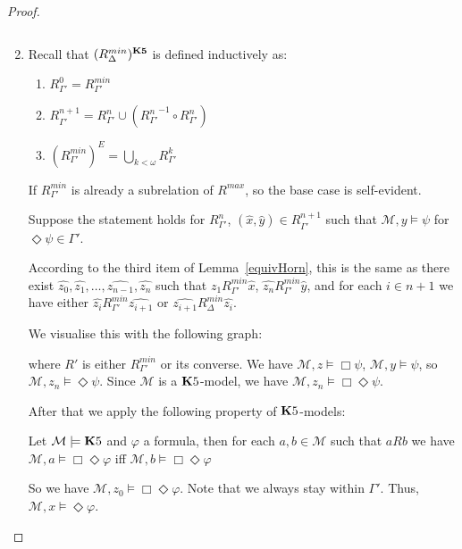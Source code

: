 \documentclass[a4paper]{article}
\theoremstyle{defin}
\theoremstyle{theorem}
\theoremstyle{prop}
\theoremstyle{lemma}
\theoremstyle{fact}
\theoremstyle{exercise}
\theoremstyle{ex}
\theoremstyle{col}
\theoremstyle{claim}
\begin{document}
\begin{proof}
\begin{enumerate}
  $ $

  \item Recall that $(R^{min}_{\Delta})^{\bf K5}$ is defined inductively as:
  \begin{enumerate}
    \item $R_{\Gamma'}^{0} = R_{\Gamma'}^{min}$
    \item $R_{\Gamma'}^{n + 1} = R_{\Gamma'}^{n} \cup ({R_{\Gamma'}^{n}}^{-1} \circ R_{\Gamma'}^{n})$
    \item $(R^{min}_{\Gamma'})^{E} = \bigcup_{k < \omega} R_{\Gamma'}^{k}$
  \end{enumerate}

  If $R^{min}_{\Gamma'}$ is already a subrelation of $R^{max}$, so the base case is self-evident.

  Suppose the statement holds for $R_{\Gamma'}^{n}$, $(\hat{x},\hat{y}) \in R_{\Gamma'}^{n + 1}$ such that $\mathcal{M}, y \models \psi$ for $\Diamond \psi \in \Gamma'$.

  According to the third item of Lemma~\ref{equivHorn}, this is the same as there exist $\widehat{z_0}, \widehat{z_1}, \dots, \widehat{z_{n-1}}, \widehat{z_n}$ such that
  $\widehat{z_1} R^{min}_{\Gamma'} \hat{x}$, $\widehat{z_n} R^{min}_{\Gamma'} \hat{y}$, and for each $i \in n + 1$ we have either $\widehat{z_i} R^{min}_{\Gamma'} \widehat{z_{i + 1}}$ or $\widehat{z_{i + 1}} R^{min}_{\Delta} \widehat{z_i}$.

  We visualise this with the following graph:

  where $R'$ is either $R_{\Gamma'}^{min}$ or its converse. We have $\mathcal{M}, z \models \Box \psi$, $\mathcal{M}, y \models \psi$, so $\mathcal{M}, z_{n} \models \Diamond \psi$. Since $\mathcal{M}$ is a ${\bf K}5$-model, we have $\mathcal{M}, z_{n} \models \Box \Diamond \psi$.

  After that we apply the following property of ${\bf K}5$-models:
  \begin{center}
    Let $\mathcal{M} \models {\bf K}5$ and $\varphi$ a formula, then for each $a, b \in \mathcal{M}$ such that $a R b$ we have $\mathcal{M}, a \models \Box \Diamond \varphi$ iff $\mathcal{M}, b \models \Box \Diamond \varphi$
  \end{center}
  So we have $\mathcal{M}, z_0 \models \Box \Diamond \varphi$. Note that we always stay within $\Gamma'$. Thus, $\mathcal{M}, x \models \Diamond \varphi$.


\end{enumerate}
\end{proof}
\end{document}
